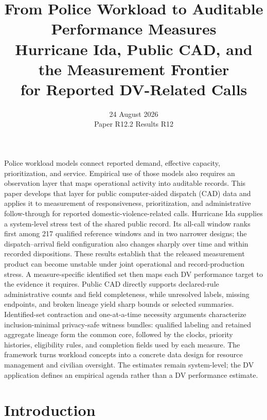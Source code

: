 \documentclass[11pt]{article}
\title{\vspace{-1.7em}\textbf{From Police Workload to Auditable Performance Measures}\\[0.35em]
\large Hurricane Ida, Public CAD, and the Measurement Frontier\\[-0.02em]
\large for Reported DV-Related Calls}
\author{}
\date{24 August 2026\\[0.2em]\small Paper R12.2 \quad Results R12}
\begin{document}
\maketitle
\thispagestyle{plain}
\vspace{-1.3em}

\begin{plainbox}[title=Abstract]
Police workload models connect reported demand, effective capacity, prioritization, and service. Empirical use of those models also requires an observation layer that maps operational activity into auditable records. This paper develops that layer for public computer-aided dispatch (CAD) data and applies it to measurement of responsiveness, prioritization, and administrative follow-through for reported domestic-violence-related calls. Hurricane Ida supplies a system-level stress test of the shared public record. Its all-call window ranks first among 217 qualified reference windows and in two narrower designs; the dispatch--arrival field configuration also changes sharply over time and within recorded dispositions. These results establish that the released measurement product can become unstable under joint operational and record-production stress. A measure-specific identified set then maps each DV performance target to the evidence it requires. Public CAD directly supports declared-rule administrative counts and field completeness, while unresolved labels, missing endpoints, and broken lineage yield sharp bounds or selected summaries. Identified-set contraction and one-at-a-time necessity arguments characterize inclusion-minimal privacy-safe witness bundles: qualified labeling and retained aggregate lineage form the common core, followed by the clocks, priority histories, eligibility rules, and completion fields used by each measure. The framework turns workload concepts into a concrete data design for resource management and civilian oversight. The estimates remain system-level; the DV application defines an empirical agenda rather than a DV performance estimate.
\end{plainbox}


\newpage

\section{Introduction}
\end{document}
